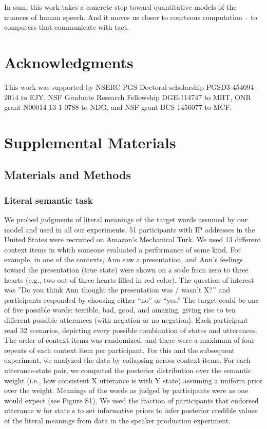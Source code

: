 \documentclass[floatsintext,man]{apa6}
\theoremstyle{definition}
\theoremstyle{definition}
\theoremstyle{definition}
\theoremstyle{remark}
\begin{document}
In sum, this work takes a concrete step toward quantitative models of
the nuances of human speech. And it moves us closer to courteous
computation -- to computers that communicate with tact.

\section{Acknowledgments}\label{acknowledgments}

This work was supported by NSERC PGS Doctoral scholarship
PGSD3-454094-2014 to EJY, NSF Graduate Research Fellowship DGE-114747 to
MHT, ONR grant N00014-13-1-0788 to NDG, and NSF grant BCS 1456077 to
MCF.

\newpage

\section{Supplemental Materials}\label{supplemental-materials}

\subsection{Materials and Methods}\label{materials-and-methods}

\subsubsection{Literal semantic task}\label{literal-semantic-task}

We probed judgments of literal meanings of the target words assumed by
our model and used in all our experiments. 51 participants with IP
addresses in the United States were recruited on Amazon's Mechanical
Turk. We used 13 different context items in which someone evaluated a
performance of some kind. For example, in one of the contexts, Ann saw a
presentation, and Ann's feelings toward the presentation (true state)
were shown on a scale from zero to three hearts (e.g., two out of three
hearts filled in red color). The question of interest was ''Do you think
Ann thought the presentation was / wasn't X?'' and participants
responded by choosing either \enquote{no} or \enquote{yes.} The target
could be one of five possible words: terrible, bad, good, and amazing,
giving rise to ten different possible utterances (with negation or no
negation). Each participant read 32 scenarios, depicting every possible
combination of states and utterances. The order of context items was
randomized, and there were a maximum of four repeats of each context
item per participant. For this and the subsequent experiment, we
analyzed the data by collapsing across context items. For each
utterance-state pair, we computed the posterior distribution over the
semantic weight (i.e., how consistent X utterance is with Y state)
assuming a uniform prior over the weight. Meanings of the words as
judged by participants were as one would expect (see Figure S1). We used
the fraction of participants that endorsed utterance w for state s to
set informative priors to infer posterior credible values of the literal
meanings from data in the speaker production experiment.
\end{document}
